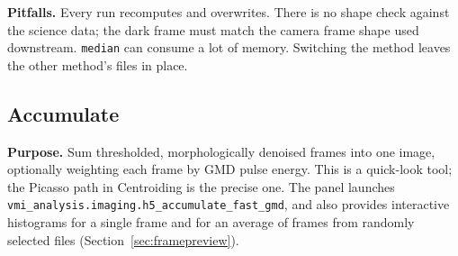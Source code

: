 \documentclass[11pt,a4paper]{article}
\newcommand{\code}[1]{\texttt{#1}}
\begin{document}
\textbf{Pitfalls.} Every run recomputes and overwrites. There is no shape
check against the science data; the dark frame must match the camera frame
shape used downstream. \code{median} can consume a lot of memory. Switching
the method leaves the other method's files in place.

\subsection{Accumulate}
\label{sec:accumulate}

\textbf{Purpose.} Sum thresholded, morphologically denoised frames into one
image, optionally weighting each frame by GMD pulse energy. This is a
quick-look tool; the Picasso path in Centroiding is the precise one. The
panel launches \code{vmi\_\allowbreak{}analysis.\allowbreak{}imaging.\allowbreak{}h5\_\allowbreak{}accumulate\_\allowbreak{}fast\_\allowbreak{}gmd}, and
also provides interactive histograms for a single frame and for an average
of frames from randomly selected files
(Section~\ref{sec:framepreview}).
\end{document}
